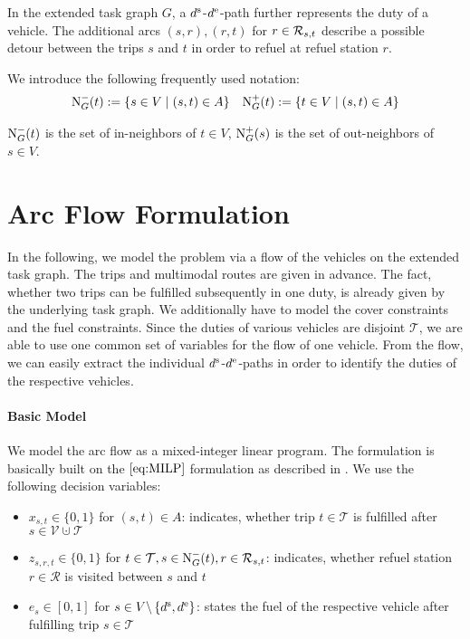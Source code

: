 In the extended task graph $G$, a $d^{\operatorname{s}}$-$d^{\operatorname{e}}$-path further represents the duty of a vehicle. The additional arcs $(s,r),(r,t)$ for $r\in\mathcal{R}_{s,t}$ describe a possible detour between the trips $s$ and $t$ in order to refuel at refuel station $r$.

We introduce the following frequently used notation:
\begin{align*}
	\operatorname{N}_G^-(t) := \left\{s\in V\mid (s,t)\in A\right\} && \operatorname{N}_G^+(t) := \left\{t\in V\mid (s,t)\in A\right\}
\end{align*}

$\operatorname{N}_G^-(t)$ is the set of in-neighbors of $t\in V$, $\operatorname{N}_G^+(s)$ is the set of out-neighbors of $s\in V$.


\section{Arc Flow Formulation}

In the following, we model the problem via a flow of the vehicles on the extended task graph. The trips and multimodal routes are given in advance. The fact, whether two trips can be fulfilled subsequently in one duty, is already given by the underlying task graph. We additionally have to model the cover constraints and the fuel constraints. Since the duties of various vehicles are disjoint \wrt $\mathcal{T}$, we are able to use one common set of variables for the flow of one vehicle. From the flow, we can easily extract the individual $d^{\operatorname{s}}$-$d^{\operatorname{e}}$-paths in order to identify the duties of the respective vehicles.

\paragraph{Basic Model} \parfill

We model the arc flow as a mixed-integer linear program. The formulation is basically built on the $\eqref{eq:MILP}$ formulation as described in \cite[p. 34]{Kaiser_Knoll}. We use the following decision variables:
\begin{itemize}
	\item{$x_{s,t}\in\{0,1\}$ for $(s,t)\in A$: indicates, whether trip $t\in\mathcal{T}$ is fulfilled after ${s\in \mathcal{V}\cupdot\mathcal{T}}$}
	\item{$z_{s,r,t}\in\{0,1\}$ for $t\in\mathcal{T},s\in\operatorname{N}_G^-(t),r\in\mathcal{R}_{s,t}$: indicates, whether refuel station $r\in\mathcal{R}$ is visited between $s$ and $t$}
	\item{$e_s\in[0,1]$ for $s\in V\backslash\left\{d^{\operatorname{s}},d^{\operatorname{e}}\right\}$: states the fuel of the respective vehicle after fulfilling trip $s\in\mathcal{T}$}
\end{itemize}

